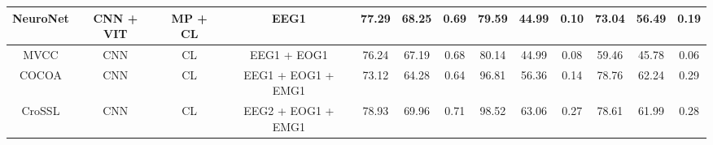 \begin{table*}[!htbp]
{{\begin{tabular}{c|c|c|c|ccc|ccc|ccc}
NeuroNet \cite{ref19}                                                                              & CNN
  + VIT                                                                                       & MP
  + CL                                                                                               & EEG1                                & 77.29          & 68.25          & 0.69                                                                     & 79.59          & 44.99          & 0.10                                                          & 73.04          & 56.49          & 0.19                                                              \\ 
\hline
MVCC \cite{ref20}                                                                                  & CNN                                                                                               & CL                                                                                                      & EEG1 + EOG1                         & 76.24          & 67.19          & 0.68                                                                     & 80.14          & 44.99          & 0.08                                                          & 59.46          & 45.78          & 0.06                                                              \\
COCOA \cite{ref21}                                                                                 & CNN                                                                                               & CL                                                                                                      & EEG1 + EOG1 + EMG1                  & 73.12          & 64.28          & 0.64                                                                     & 96.81          & 56.36          & 0.14                                                          & 78.76          & 62.24          & 0.29                                                              \\
CroSSL \cite{ref22}                                                                                & CNN                                                                                               & CL                                                                                                      & EEG2 + EOG1 + EMG1                  & 78.93          & 69.96          & 0.71                                                                     & 98.52          & 63.06          & 0.27                                                          & 78.61          & 61.99          & 0.28                                                              \\

\end{tabular}}}
\end{table*}
